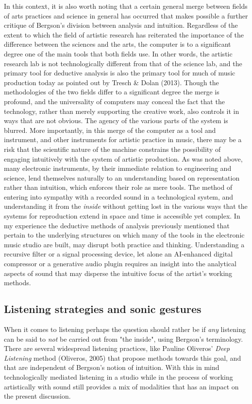 \documentclass[11pt]{article}
\makeatletter
\newcommand{\cslcitation}[2]
 {\protect\hyper@linkstart{cite}{citeproc_bib_item_#1}#2\hyper@linkend}
\makeatother
\begin{document}
In this context, it is also worth noting that a certain general merge between fields of arts practices and science in general has occurred that makes possible a further critique of Bergson's division between analysis and intuition.
Regardless of the extent to which the field of artistic research has reiterated the importance of the difference between the sciences and the arts, the computer is to a significant degree one of the main tools that both fields use.
In other words, the artistic research lab is not technologically different from that of the science lab, and the primary tool for deductive analysis is also the primary tool for much of music production today as pointed out by Tresch \& Dolan (\cslcitation{34}{2013}).
Though the methodologies of the two fields differ to a significant degree the merge is profound, and the universality of computers may conceal the fact that the technology, rather than merely supporting the creative work, also controls it in ways that are not obvious.
The agency of the various parts of the system is blurred.
More importantly, in this merge of the computer as a tool and instrument, and other instruments for artistic practice in music, there may be a risk that the scientific nature of the machine constrains the possibility of engaging intuitively with the system of artistic production.
As was noted above, many electronic instruments, by their immediate relation to engineering and science, lend themselves naturally to an understanding based on representation rather than intuition, which enforces their role as mere tools.
The method of entering into sympathy with a recorded sound in a technological system, and understanding it from the \emph{inside} without getting lost in the various ways that the systems for reproduction extend in space and time is accessible yet complex.
In my  experience the deductive methods of analysis previously mentioned that pertain to the underlying structures on which many of the tools in the electronic music studio are built, may disrupt both practice and thinking.
Understanding a recursive filter or a signal processing device, let alone an AI-enhanced digital compressor or a generative audio plugin requires an insight into the analytical aspects of sound that may disperse the intuitive focus of the artist's working methods.
\subsection*{Listening strategies and sonic gestures}
\label{sec:org07b3977}
When it comes to listening perhaps the question should rather be if \emph{any} listening can be said to \emph{not} be carried out from "the inside", using Bergson's terminology.
There are several widespread listening practices, like Pauline Oliveros' \emph{Deep Listening} method (\cslcitation{26}{Oliveros, 2005}) that propose methods towards this goal, and that are independent of Bergson's notion of intuition.
With this in mind technologically mediated listening in a studio while in the process of working artistically with sound still provides a mix of modalities that has an impact on the present discussion.
\end{document}
